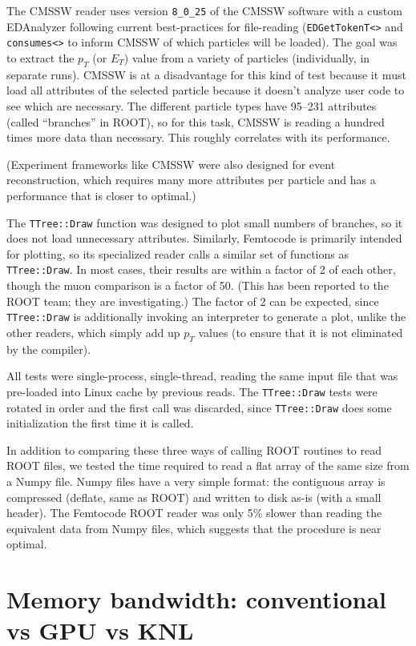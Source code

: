 \documentclass[12pt]{article}
\begin{document}
The CMSSW reader uses version {\tt 8\_0\_25} of the CMSSW software with a custom EDAnalyzer following current best-practices for file-reading ({\tt EDGetTokenT<>} and {\tt consumes<>} to inform CMSSW of which particles will be loaded). The goal was to extract the $p_T$ (or $E_T$) value from a variety of particles (individually, in separate runs). CMSSW is at a disadvantage for this kind of test because it must load all attributes of the selected particle because it doesn't analyze user code to see which are necessary. The different particle types have 95--231 attributes (called ``branches'' in ROOT), so for this task, CMSSW is reading a hundred times more data than necessary. This roughly correlates with its performance.

(Experiment frameworks like CMSSW were also designed for event reconstruction, which requires many more attributes per particle and has a performance that is closer to optimal.)

The {\tt TTree::Draw} function was designed to plot small numbers of branches, so it does not load unnecessary attributes. Similarly, Femtocode is primarily intended for plotting, so its specialized reader calls a similar set of functions as {\tt TTree::Draw}. In most cases, their results are within a factor of 2 of each other, though the muon comparison is a factor of 50. (This has been reported to the ROOT team; they are investigating.) The factor of 2 can be expected, since {\tt TTree::Draw} is additionally invoking an interpreter to generate a plot, unlike the other readers, which simply add up $p_T$ values (to ensure that it is not eliminated by the compiler).

All tests were single-process, single-thread, reading the same input file that was pre-loaded into Linux cache by previous reads. The {\tt TTree::Draw} tests were rotated in order and the first call was discarded, since {\tt TTree::Draw} does some initialization the first time it is called.

In addition to comparing these three ways of calling ROOT routines to read ROOT files, we tested the time required to read a flat array of the same size from a Numpy file. Numpy files have a very simple format: the contiguous array is compressed (deflate, same as ROOT) and written to disk as-is (with a small header). The Femtocode ROOT reader was only 5\% slower than reading the equivalent data from Numpy files, which suggests that the procedure is near optimal.

\section*{Memory bandwidth: conventional vs GPU vs KNL}
\end{document}
